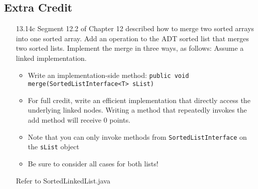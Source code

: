 \documentclass[10pt]{article}
\begin{document}
		\subsection{Extra Credit}
			\begin{enumerate}
				\item[13.14c] Segment 12.2 of Chapter 12 described how to merge two sorted arrays into one sorted array. Add an operation to the ADT sorted list that merges two sorted lists. Implement the merge in three ways, as follows: Assume a linked implementation.
					\begin{itemize}
						\item Write an implementation-side method: \texttt{public void merge(SortedListInterface<T> sList)}
						
						\item For full credit, write an efficient implementation that directly access the underlying linked nodes. Writing a method that repeatedly invokes the add method will receive 0 points.
						
						\item Note that you can only invoke methods from \texttt{SortedListInterface} on the \texttt{sList} object
						
						\item Be sure to consider all cases for both lists!
					\end{itemize}
					
					\vspace{0.5cm}
					Refer to SortedLinkedList.java
			\end{enumerate}
\end{document}
